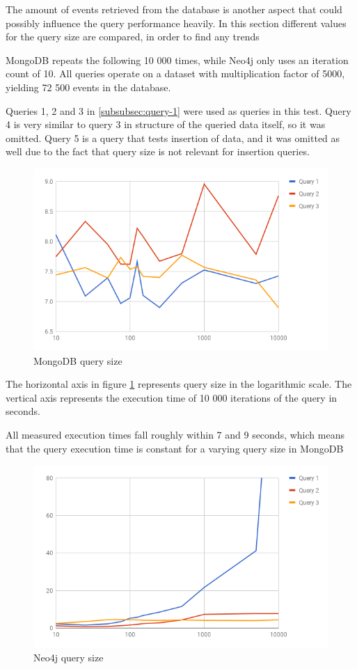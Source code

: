 The amount of events retrieved from the database is another aspect that could possibly influence the query performance heavily.
In this section different values for the query size are compared, in order to find any trends

MongoDB repeats the following 10 000 times, while Neo4j only uses an iteration count of 10.
All queries operate on a dataset with multiplication factor of 5000, yielding 72 500 events in the database.

Queries 1, 2 and 3 in \cref{subsubsec:query-1} were used as queries in this test.
Query 4 is very similar to query 3 in structure of the queried data itself, so it was omitted.
Query 5 is a query that tests insertion of data, and it was omitted as well due to the fact that query size is not relevant for insertion queries.

\begin{figure}
  \centering
  \includegraphics[width=.8\textwidth]{img/mongodb-query-size.png}
  \caption{MongoDB query size}
  \label{fig:mongodb-query-size}
\end{figure}

The horizontal axis in figure \ref{fig:mongodb-query-size} represents query size in the logarithmic scale.
The vertical axis represents the execution time of 10 000 iterations of the query in seconds.

All measured execution times fall roughly within 7 and 9 seconds, which means that the query execution time is constant for a varying query size in MongoDB

\begin{figure}
  \centering
  \includegraphics[width=.8\textwidth]{img/neo4j-query-size.png}
  \caption{Neo4j query size}
  \label{fig:neo4j-query-size}
\end{figure}

